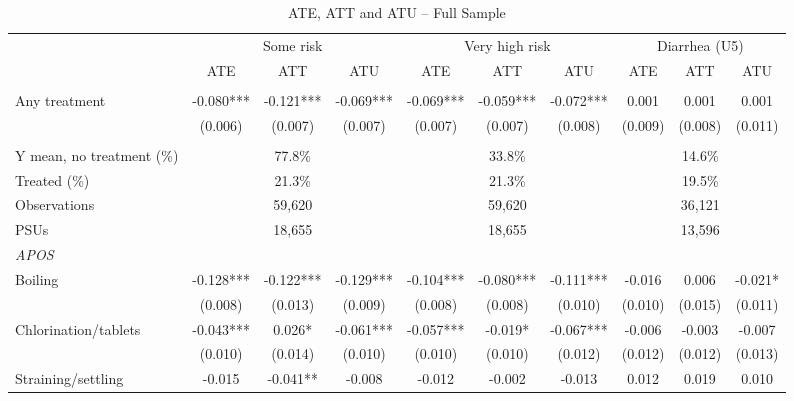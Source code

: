 \begin{table}[htbp]
\centering
\caption{ATE, ATT and ATU -- Full Sample}
\label{tab:ate-att-atu-clustered-aggregated}
\scriptsize
\setlength{\tabcolsep}{4pt}
\renewcommand{\arraystretch}{0.92}
\begin{adjustbox}{max width=\linewidth}
\begin{tabular}{lccccccccc}
\hline\hline
 & \multicolumn{3}{c}{Some risk} & \multicolumn{3}{c}{Very high risk} & \multicolumn{3}{c}{Diarrhea (U5)} \\
\cmidrule(lr){2-4}\cmidrule(lr){5-7}\cmidrule(lr){8-10}
 & ATE & ATT & ATU & ATE & ATT & ATU & ATE & ATT & ATU \\
\addlinespace[3pt]
\multicolumn{10}{l}{\textit{IRM}} \\
Any treatment & -0.080*** & -0.121*** & -0.069*** & -0.069*** & -0.059*** & -0.072*** & 0.001 & 0.001 & 0.001 \\
 & (0.006) & (0.007) & (0.007) & (0.007) & (0.007) & (0.008) & (0.009) & (0.008) & (0.011) \\
\addlinespace[6pt]
\multicolumn{10}{l}{\textit{Descriptive statistics and sample}} \\
Y mean, no treatment (\%) & \multicolumn{3}{c}{77.8\%} & \multicolumn{3}{c}{33.8\%} & \multicolumn{3}{c}{14.6\%} \\
Treated (\%) & \multicolumn{3}{c}{21.3\%} & \multicolumn{3}{c}{21.3\%} & \multicolumn{3}{c}{19.5\%} \\
Observations & \multicolumn{3}{c}{59,620} & \multicolumn{3}{c}{59,620} & \multicolumn{3}{c}{36,121} \\
PSUs & \multicolumn{3}{c}{18,655} & \multicolumn{3}{c}{18,655} & \multicolumn{3}{c}{13,596} \\
\midrule
\multicolumn{10}{l}{\textit{APOS}} \\
Boiling & -0.128*** & -0.122*** & -0.129*** & -0.104*** & -0.080*** & -0.111*** & -0.016 & 0.006 & -0.021* \\
 & (0.008) & (0.013) & (0.009) & (0.008) & (0.008) & (0.010) & (0.010) & (0.015) & (0.011) \\
Chlorination/tablets & -0.043*** & 0.026* & -0.061*** & -0.057*** & -0.019* & -0.067*** & -0.006 & -0.003 & -0.007 \\
 & (0.010) & (0.014) & (0.010) & (0.010) & (0.010) & (0.012) & (0.012) & (0.012) & (0.013) \\
Straining/settling & -0.015 & -0.041** & -0.008 & -0.012 & -0.002 & -0.013 & 0.012 & 0.019 & 0.010 \\

\end{tabular}
\end{adjustbox}
\end{table}
